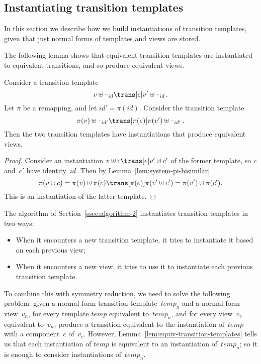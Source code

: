 \subsection{Instantiating transition templates}

In this section we describe how we build instantiations of transition
templates, given that just normal forms of templates and views are stored.

The following lemma shows that equivalent transition templates are
instantiated to equivalent transitions, and so produce equivalent views.
%
\begin{lemma}
\label{lem:equiv-transition-templates}
Consider a transition template 
\[
v \uplus \hole{id} \trans[e] v' \uplus \hole{id} \,.
\]
Let $\pi$ be a remapping, and let $id' = \pi(id)$.
Consider the transition template
\[
\pi(v) \uplus \hole{id'} \trans[\pi(e)] \pi(v') \uplus \hole{id'} \,.
\]
Then the two transition templates have instantiations that produce equivalent
views. 
\end{lemma}


\begin{proof}
Consider an instantiation $v \uplus c \trans[e] v' \uplus c'$ of the former
template, so $c$ and~$c'$ have identity~$id$.  Then by
Lemma~\ref{lem:system-pi-bisimilar}
\[
\pi(v \uplus c) = \pi(v) \uplus \pi(c) \trans[\pi(e)] 
  \pi(v' \uplus c') = \pi(v') \uplus \pi(c') .
\]
This is an instantiation of the latter template.
\end{proof}


The algorithm of Section~\ref{ssec:algorithm-2} instantiates transition
templates in two ways:
%
\begin{itemize}
\item When it encounters a new transition template, it tries to instantiate it
  based on each previous view;

\item When it encounters a new view, it tries to use it to instantiate each
  previous transition template.
\end{itemize}
%
To combine this with symmetry reduction, we need to solve the following
problem: given a normal-form transition template~$temp_n$ and a normal form
view~$v_n$, for every template $temp$ equivalent to~$temp_n$, and for every
view~$v_c$ equivalent to~$v_n$, produce a transition equivalent to the
instantiation of~$temp$ with a component~$c$ of~$v_c$.  However,
Lemma~\ref{lem:equiv-transition-templates} tells us that each instantiation of
$temp$ is equivalent to an instantiation of~$temp_n$; so it is enough to
consider instantiations of~$temp_n$. 

